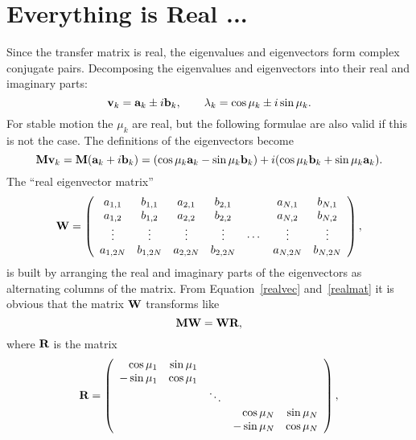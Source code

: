 \section{Everything is Real ...}
\label{real}
Since the transfer matrix is real,
the eigenvalues and eigenvectors form complex conjugate pairs.
Decomposing the eigenvalues and eigenvectors into their real and
imaginary parts:
\begin{equation}
\bold{v}_k = \bold{a}_k \pm i \bold{b}_k, \qquad
\lambda_k = \cos \mu_k \pm i \sin \mu_k.
\end{equation}
For stable motion the $\mu_k$ are real,
but the following formulae are also valid if this is not the case.
The definitions of the eigenvectors become
\begin{equation} \label{realvec}
\bold{M} \bold{v}_k = \bold{M} ( \bold{a}_k+i \bold{b}_k ) =
(\cos\mu_k\bold{a}_k - \sin\mu_k\bold{b}_k)
 + i (\cos\mu_k\bold{b}_k + \sin\mu_k \bold{a}_k).
\end{equation}
The ``real eigenvector matrix''
\begin{equation} \label{realmat}
\bold{W} = \left( \begin{array}{ccccccc}
a_{1,1} & b_{1,1} & a_{2,1} & b_{2,1} &        & a_{N,1} & b_{N,1} \\
a_{1,2} & b_{1,2} & a_{2,2} & b_{2,2} &        & a_{N,2} & b_{N,2} \\
\vdots  & \vdots  & \vdots  & \vdots  & \cdots & \vdots  & \vdots  \\
a_{1,2N}& b_{1,2N}& a_{2,2N}& b_{2,2N}&        & a_{N,2N}& b_{N,2N}
\end{array} \right),
\end{equation}
is built by arranging the real and imaginary parts of the eigenvectors
as alternating columns of the matrix.
From Equation~\ref{realvec} and~\ref{realmat} it is obvious that the
matrix $\bold{W}$ transforms like
\begin{equation}
\bold{M} \bold{W} = \bold{W} \bold{R},
\end{equation}
where $\bold{R}$ is the matrix
\begin{equation}
\bold{R} = \left( \begin{array}{rrrrr}
\cos\mu_1 & \sin\mu_1 & & & \\ -\sin\mu_1 & \cos\mu_1 & & & \\
& & \ddots & & \\
& & & \cos\mu_N & \sin\mu_N \\ & & & -\sin\mu_N & \cos\mu_N
\end{array} \right), 
\end{equation}
